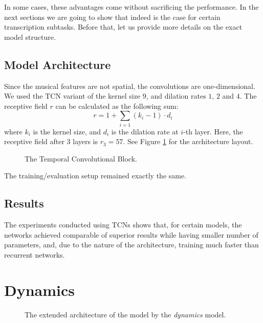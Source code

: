 In some cases, these advantages come without sacrificing the performance. In the next sections we are going to show that indeed is the case for certain transcription subtasks. Before that, let us provide more details on the exact model structure.

\subsection{Model Architecture}

Since the musical features are not spatial, the convolutions are one-dimensional. We used the TCN variant of the kernel size $9$, and dilation rates $1$, $2$ and $4$. The receptive field $r$ can be calculated as the following sum: \[r = 1 + \sum_{i=1}\left(k_i - 1\right)\cdot d_i\] where $k_i$ is the kernel size, and $d_i$ is the dilation rate at $i$-th layer. Here, the receptive field after $3$ layers is $r_3 = 57$. See Figure \ref{temporal_convolutional_network} for the architecture layout.

\begin{figure}[ht!]
\centering

\caption[The Temporal Convolutional Block.]{The Temporal Convolutional Block.}
\label{temporal_convolutional_network}
\end{figure}

The training/evaluation setup remained exactly the same.

\subsection{Results}

The experiments conducted using TCNs shows that, for certain models, the networks achieved comparable of superior results while having smaller number of parameters, and, due to the nature of the architecture, training much faster than recurrent networks. 

\section{Dynamics}

\missing

\begin{figure}[!ht]
\centering

\caption[The extended architecture of the model.]{The extended architecture of the model by the \emph{dynamics} model.}
\end{figure}